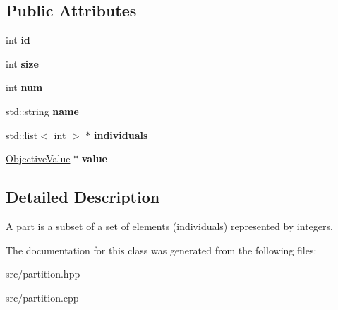 \subsection*{Public Attributes}
\begin{DoxyCompactItemize}
\item 
\hypertarget{classPart_a838bf6b7710a67f982193a0dcc2f102f}{int {\bfseries id}}\label{classPart_a838bf6b7710a67f982193a0dcc2f102f}

\item 
\hypertarget{classPart_a1048e12cbb00ea6f98edebcab1d05d92}{int {\bfseries size}}\label{classPart_a1048e12cbb00ea6f98edebcab1d05d92}

\item 
\hypertarget{classPart_ac964043da9eea5854384a45ee809a29d}{int {\bfseries num}}\label{classPart_ac964043da9eea5854384a45ee809a29d}

\item 
\hypertarget{classPart_ab484eb7dd68d555073ef358a458c87c5}{std\-::string {\bfseries name}}\label{classPart_ab484eb7dd68d555073ef358a458c87c5}

\item 
\hypertarget{classPart_a12f364b91efb5702af492cbdef1990fe}{std\-::list$<$ int $>$ $\ast$ {\bfseries individuals}}\label{classPart_a12f364b91efb5702af492cbdef1990fe}

\item 
\hypertarget{classPart_af9f5786f51cc11cffcf5c77ea656ae40}{\hyperlink{classObjectiveValue}{Objective\-Value} $\ast$ {\bfseries value}}\label{classPart_af9f5786f51cc11cffcf5c77ea656ae40}

\end{DoxyCompactItemize}


\subsection{Detailed Description}
A part is a subset of a set of elements (individuals) represented by integers. 

The documentation for this class was generated from the following files\-:\begin{DoxyCompactItemize}
\item 
src/partition.\-hpp\item 
src/partition.\-cpp\end{DoxyCompactItemize}
